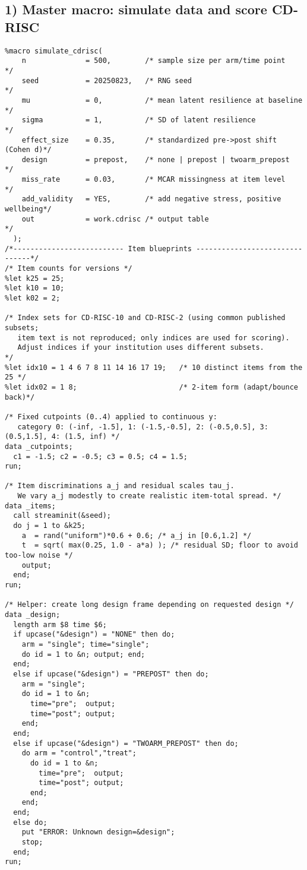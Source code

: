 \documentclass[12pt]{article}
\begin{document}
\subsection*{1) Master macro: simulate data and score CD-RISC}
\begin{lstlisting}
%macro simulate_cdrisc(
    n              = 500,        /* sample size per arm/time point        */
    seed           = 20250823,   /* RNG seed                              */
    mu             = 0,          /* mean latent resilience at baseline    */
    sigma          = 1,          /* SD of latent resilience               */
    effect_size    = 0.35,       /* standardized pre->post shift (Cohen d)*/
    design         = prepost,    /* none | prepost | twoarm_prepost       */
    miss_rate      = 0.03,       /* MCAR missingness at item level        */
    add_validity   = YES,        /* add negative stress, positive wellbeing*/
    out            = work.cdrisc /* output table                          */
  );
/*-------------------------- Item blueprints -------------------------------*/
/* Item counts for versions */
%let k25 = 25;
%let k10 = 10;
%let k02 = 2;

/* Index sets for CD-RISC-10 and CD-RISC-2 (using common published subsets;
   item text is not reproduced; only indices are used for scoring). 
   Adjust indices if your institution uses different subsets.               */
%let idx10 = 1 4 6 7 8 11 14 16 17 19;   /* 10 distinct items from the 25 */
%let idx02 = 1 8;                        /* 2-item form (adapt/bounce back)*/

/* Fixed cutpoints (0..4) applied to continuous y: 
   category 0: (-inf, -1.5], 1: (-1.5,-0.5], 2: (-0.5,0.5], 3: (0.5,1.5], 4: (1.5, inf) */
data _cutpoints;
  c1 = -1.5; c2 = -0.5; c3 = 0.5; c4 = 1.5;
run;

/* Item discriminations a_j and residual scales tau_j.
   We vary a_j modestly to create realistic item-total spread. */
data _items;
  call streaminit(&seed);
  do j = 1 to &k25;
    a  = rand("uniform")*0.6 + 0.6; /* a_j in [0.6,1.2] */
    t  = sqrt( max(0.25, 1.0 - a*a) ); /* residual SD; floor to avoid too-low noise */
    output;
  end;
run;

/* Helper: create long design frame depending on requested design */
data _design;
  length arm $8 time $6;
  if upcase("&design") = "NONE" then do;
    arm = "single"; time="single";
    do id = 1 to &n; output; end;
  end;
  else if upcase("&design") = "PREPOST" then do;
    arm = "single";
    do id = 1 to &n;
      time="pre";  output;
      time="post"; output;
    end;
  end;
  else if upcase("&design") = "TWOARM_PREPOST" then do;
    do arm = "control","treat";
      do id = 1 to &n;
        time="pre";  output;
        time="post"; output;
      end;
    end;
  end;
  else do;
    put "ERROR: Unknown design=&design";
    stop;
  end;
run;


\end{lstlisting}
\end{document}
